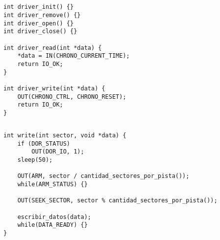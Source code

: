 \subsection{}
\begin{codesnippet}
\begin{verbatim}
int driver_init() {}
int driver_remove() {}
int driver_open() {}
int driver_close() {}

int driver_read(int *data) {
    *data = IN(CHRONO_CURRENT_TIME);
    return IO_OK;
}

int driver_write(int *data) {
    OUT(CHRONO_CTRL, CHRONO_RESET);
    return IO_OK;
}
\end{verbatim}
\end{codesnippet}

\subsection{}

\setcounter{subsection}{10}
\subsection{}

\subsubsection{}
\begin{codesnippet}
\begin{verbatim}
int write(int sector, void *data) {
    if (DOR_STATUS)
        OUT(DOR_IO, 1);
    sleep(50);

    OUT(ARM, sector / cantidad_sectores_por_pista());
    while(ARM_STATUS) {}

    OUT(SEEK_SECTOR, sector % cantidad_sectores_por_pista());

    escribir_datos(data);
    while(DATA_READY) {}
}
\end{verbatim}
\end{codesnippet}

